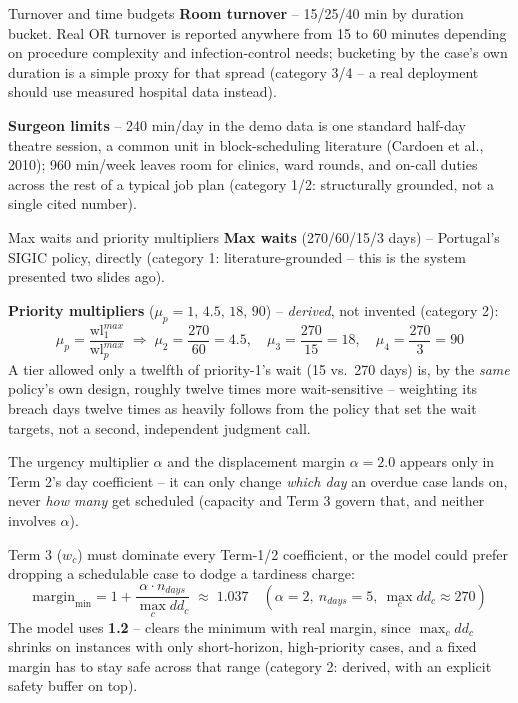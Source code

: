 \documentclass[aspectratio=169]{beamer}
\begin{document}
\begin{frame}{Turnover and time budgets}
  \textbf{Room turnover} -- 15/25/40 min by duration bucket. Real OR
  turnover is reported anywhere from 15 to 60 minutes depending on
  procedure complexity and infection-control needs; bucketing by the
  case's own duration is a simple proxy for that spread (category 3/4 --
  a real deployment should use measured hospital data instead).
  \vspace{0.5em}

  \textbf{Surgeon limits} -- 240 min/day in the demo data is one standard
  half-day theatre session, a common unit in block-scheduling literature
  (Cardoen et al., 2010); 960 min/week leaves room for clinics, ward
  rounds, and on-call duties across the rest of a typical job plan
  (category 1/2: structurally grounded, not a single cited number).
\end{frame}

\begin{frame}{Max waits and priority multipliers}
  \textbf{Max waits} (270/60/15/3 days) -- Portugal's SIGIC policy,
  directly (category 1: literature-grounded -- this is the system
  presented two slides ago).
  \vspace{0.5em}

  \textbf{Priority multipliers} ($\mu_p = 1,\,4.5,\,18,\,90$) --
  \emph{derived}, not invented (category 2):
  \[
    \mu_p = \frac{\text{wl}^{max}_1}{\text{wl}^{max}_p}
    \;\Rightarrow\;
    \mu_2=\frac{270}{60}=4.5,\quad
    \mu_3=\frac{270}{15}=18,\quad
    \mu_4=\frac{270}{3}=90
  \]
  \pause
  A tier allowed only a twelfth of priority-1's wait (15 vs.\ 270 days) is,
  by the \emph{same} policy's own design, roughly twelve times more
  wait-sensitive -- weighting its breach days twelve times as heavily
  follows from the policy that set the wait targets, not a second,
  independent judgment call.
\end{frame}

\begin{frame}{The urgency multiplier $\alpha$ and the displacement margin}
  $\alpha=2.0$ appears only in Term 2's day coefficient -- it can only
  change \emph{which day} an overdue case lands on, never \emph{how many}
  get scheduled (capacity and Term 3 govern that, and neither involves
  $\alpha$).
  \vspace{0.5em}

  Term 3 ($w_c$) must dominate every Term-1/2 coefficient, or the model
  could prefer dropping a schedulable case to dodge a tardiness charge:
  \[
    \text{margin}_{\min} = 1 + \frac{\alpha\cdot n_{days}}{\max_c dd_c}
    \;\approx\; 1.037 \quad (\alpha=2,\ n_{days}=5,\ \max_c dd_c\approx270)
  \]
  \pause
  The model uses \textbf{1.2} -- clears the minimum with real margin, since
  $\max_c dd_c$ shrinks on instances with only short-horizon, high-priority
  cases, and a fixed margin has to stay safe across that range (category 2:
  derived, with an explicit safety buffer on top).
\end{frame}
\end{document}
